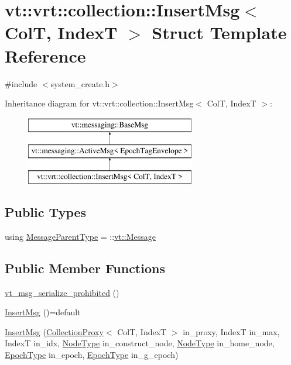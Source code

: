 \hypertarget{structvt_1_1vrt_1_1collection_1_1_insert_msg}{}\section{vt\+:\+:vrt\+:\+:collection\+:\+:Insert\+Msg$<$ ColT, IndexT $>$ Struct Template Reference}
\label{structvt_1_1vrt_1_1collection_1_1_insert_msg}


{\ttfamily \#include $<$system\+\_\+create.\+h$>$}

Inheritance diagram for vt\+:\+:vrt\+:\+:collection\+:\+:Insert\+Msg$<$ ColT, IndexT $>$\+:\begin{figure}[H]
\begin{center}
\leavevmode
\includegraphics[height=3.000000cm]{structvt_1_1vrt_1_1collection_1_1_insert_msg}
\end{center}
\end{figure}
\subsection*{Public Types}
\begin{DoxyCompactItemize}
\item 
using \hyperlink{structvt_1_1vrt_1_1collection_1_1_insert_msg_a04da6eeb695c98c1bb15837cfa2984c0}{Message\+Parent\+Type} = \+::\hyperlink{namespacevt_a3a3ddfef40b4c90915fa43cdd5f129ea}{vt\+::\+Message}
\end{DoxyCompactItemize}
\subsection*{Public Member Functions}
\begin{DoxyCompactItemize}
\item 
\hyperlink{structvt_1_1vrt_1_1collection_1_1_insert_msg_af1f1ec228c83e563542f5959f715be71}{vt\+\_\+msg\+\_\+serialize\+\_\+prohibited} ()
\item 
\hyperlink{structvt_1_1vrt_1_1collection_1_1_insert_msg_a44aed2e193e9972e28eb9c757cfe4e0b}{Insert\+Msg} ()=default
\item 
\hyperlink{structvt_1_1vrt_1_1collection_1_1_insert_msg_a56b81ce822e935c00a7419734844d288}{Insert\+Msg} (\hyperlink{structvt_1_1vrt_1_1collection_1_1_collection_proxy}{Collection\+Proxy}$<$ ColT, IndexT $>$ in\+\_\+proxy, IndexT in\+\_\+max, IndexT in\+\_\+idx, \hyperlink{namespacevt_a866da9d0efc19c0a1ce79e9e492f47e2}{Node\+Type} in\+\_\+construct\+\_\+node, \hyperlink{namespacevt_a866da9d0efc19c0a1ce79e9e492f47e2}{Node\+Type} in\+\_\+home\+\_\+node, \hyperlink{namespacevt_a985a5adf291c34a3ca263b3378388236}{Epoch\+Type} in\+\_\+epoch, \hyperlink{namespacevt_a985a5adf291c34a3ca263b3378388236}{Epoch\+Type} in\+\_\+g\+\_\+epoch)
\end{DoxyCompactItemize}
